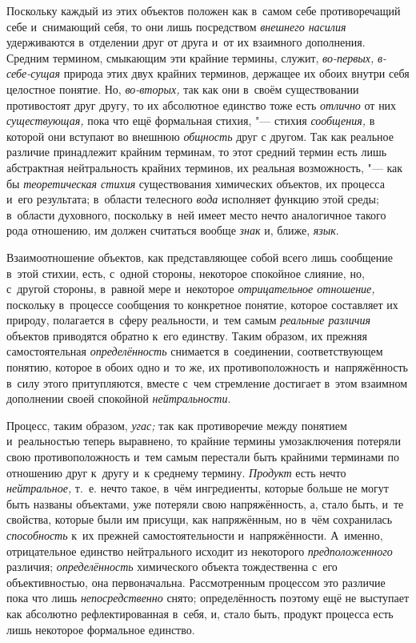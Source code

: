 Поскольку каждый из этих объектов положен как в~самом себе
противоречащий себе и~снимающий себя, то они лишь посредством
{\em внешнего насилия}
удерживаются в~отделении друг от друга и~от их
взаимного дополнения. Средним термином, смыкающим эти
крайние термины, служит,
{\em во-первых,}
{\em в-себе-сущая} природа
этих двух крайних терминов, держащее их обоих внутри себя целостное
понятие. Но, {\em во-вторых,}
так как они в~своём существовании противостоят друг другу, то
их абсолютное единство тоже есть
{\em отлично} от них
{\em существующая,} пока
что ещё формальная стихия, "--- стихия
{\em сообщения,} в
которой они вступают во внешнюю
{\em общность} друг с
другом. Так как реальное различие принадлежит крайним терминам, то этот
средний термин есть лишь абстрактная нейтральность крайних терминов, их
реальная возможность, "--- как бы
{\em теоретическая стихия}
существования химических объектов, их процесса и~его
результата; в~области телесного
{\em вода} исполняет
функцию этой среды; в~области духовного, поскольку в~ней имеет место нечто
аналогичное такого рода отношению, им должен считаться вообще
{\em знак} и, ближе,
{\em язык}.

Взаимоотношение объектов, как представляющее собой всего лишь
сообщение в~этой стихии, есть, с~одной стороны, некоторое спокойное
слияние, но, с~другой стороны, в~равной мере и~некоторое
{\em отрицательное отношение,}
поскольку в~процессе сообщения то конкретное понятие, которое
составляет их природу, полагается в~сферу реальности, и~тем самым
{\em реальные различия}
объектов приводятся обратно к~его единству. Таким образом, их
прежняя самостоятельная
{\em определённость}
снимается в~соединении, соответствующем понятию, которое в
обоих одно и~то же, их противоположность и~напряжённость в~силу этого
притупляются, вместе с~чем стремление достигает в~этом взаимном дополнении
своей спокойной {\em нейтральности}.

Процесс, таким образом,
{\em угас;} так как
противоречие между понятием и~реальностью теперь выравнено, то крайние
термины умозаключения потеряли свою противоположность и~тем самым перестали
быть крайними терминами по отношению друг к~другу и~к среднему термину.
{\em Продукт} есть нечто
{\em нейтральное,} т.~е.
нечто такое, в~чём ингредиенты, которые больше не могут быть названы
объектами, уже потеряли свою напряжённость, а, стало быть, и~те свойства,
которые были им присущи, как напряжённым, но в~чём сохранилась
{\em способность} к~их
прежней самостоятельности и~напряжённости. А~именно, отрицательное единство
нейтрального исходит из некоторого
{\em предположенного}
различия;
{\em определённость}
химического объекта тождественна с~его объективностью, она
первоначальна. Рассмотренным процессом это различие пока что лишь
{\em непосредственно}
снято; определённость поэтому ещё не выступает
как абсолютно рефлектированная в~себя, и, стало быть, продукт процесса есть
лишь некоторое формальное единство.

